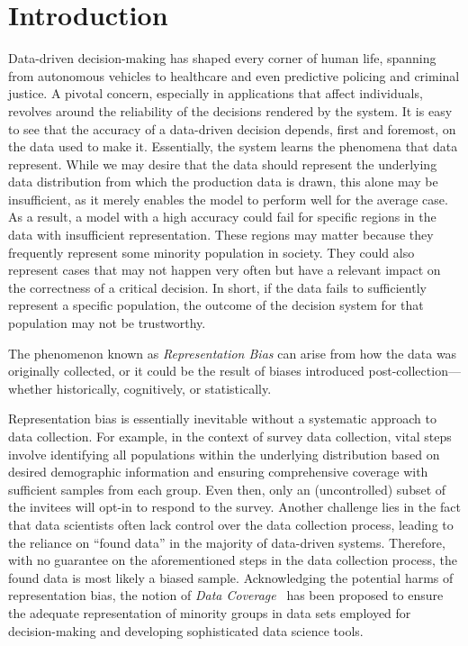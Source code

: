 \documentclass[11pt]{article}
\begin{document}
\section{Introduction}\label{sec:intro} %
Data-driven decision-making has shaped every corner of human life, spanning from autonomous vehicles to healthcare and even predictive policing and criminal justice. A pivotal concern, especially in applications that affect individuals, revolves around the reliability of the decisions rendered by the system.
It is easy to see that the accuracy of a data-driven decision depends, first and foremost, on the data used to make it. Essentially, the system learns the phenomena that data represent. While we may desire that the data should represent the underlying data distribution from which the production data is drawn, this alone may be insufficient, as it merely enables the model to perform well for the average case.
As a result, a model with a high accuracy could fail for specific regions in the data with insufficient representation. These regions may matter because they frequently represent some minority population in society. They could also represent cases that may not happen very often but have a relevant impact on the correctness of a critical decision.
In short, if the data fails to sufficiently represent a specific population, the outcome of the decision system for that population may not be trustworthy.

The phenomenon known as \textit{Representation Bias} can arise from how the data was originally collected, or it could be the result of biases introduced post-collection—whether historically, cognitively, or statistically.

Representation bias is essentially inevitable without a systematic approach to data collection. 
For example, in the context of survey data collection, vital steps involve identifying all populations within the underlying distribution based on desired demographic information and ensuring comprehensive coverage with sufficient samples from each group. 
Even then, only an (uncontrolled) subset of the invitees will opt-in to respond to the survey.
Another challenge lies in the fact that data scientists often lack control over the data collection process, leading to the reliance on ``found data'' in the majority of data-driven systems. Therefore, with no guarantee on the aforementioned steps in the data collection process, the found data is most likely a biased sample.
Acknowledging the potential harms of representation bias, the notion of \textit{Data Coverage}~\cite{asudeh2019assessing,shahbazi2023representation} has been proposed to ensure the adequate representation of minority groups in data sets employed for decision-making and developing sophisticated data science tools. 
\end{document}
